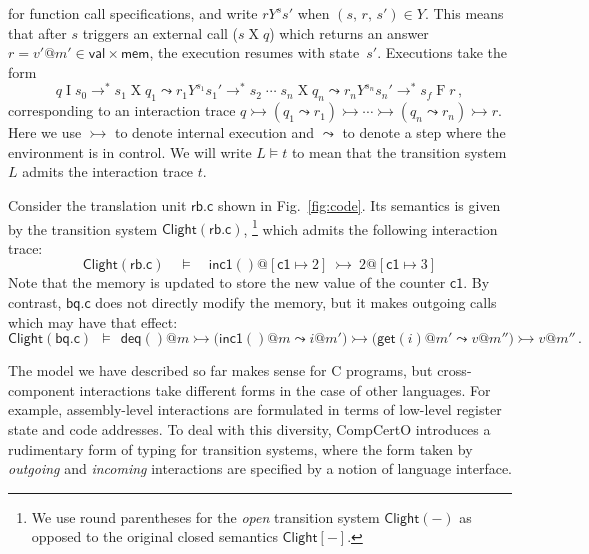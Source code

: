 \documentclass[acmsmall,screen,review,anonymous]{acmart}
\newcommand{\kw}[1]{\ensuremath{ \mathsf{#1} }}
\newcommand{\que}{\circ}
\newcommand{\ans}{\bullet}
\begin{document}
for function call specifications,
and write $r \mathrel{Y^s} s'$ when $(s, \, r, \, s') \in Y$.
This means that
after $s$ triggers an external call ($s \mathrel{X} q$)
which returns an answer $r = v'@m' \in \kw{val} \times \kw{mem}$,
the execution resumes with state~$s'$.
Executions take the form
\[
  q \mathrel{I} s_0 \rightarrow^*
  s_1 \mathrel{X} q_1 \leadsto
  r_1 \mathrel{Y^{s_1}} s_1' \rightarrow^*
  s_2 \mathrel{\cdots}
  s_n \mathrel{X} q_n \leadsto
  r_n \mathrel{Y^{s_n}} s_n' \rightarrow^*
  s_f \mathrel{F} r
  \,,
\]
corresponding to an interaction trace
$
  q \rightarrowtail
  (q_1 \leadsto r_1) \rightarrowtail
  \cdots \rightarrowtail
  (q_n \leadsto r_n) \rightarrowtail
  r
$.
Here we use $\rightarrowtail$ to denote internal execution
and $\leadsto$ to denote a step where the environment is in control.
We will write $L \vDash t$
to mean that the transition system $L$
admits the interaction trace $t$.


\begin{example} \label{ex:overview:clightsem} %
Consider the translation unit $\kw{rb.c}$ shown in Fig.~\ref{fig:code}.
Its semantics is given by 
the transition system $\kw{Clight}(\kw{rb.c})$,\!%
\footnote{%
  We use round parentheses for
  the \emph{open} transition system $\kw{Clight}(-)$
  as opposed to the original closed semantics $\kw{Clight}[-]$.
  }
which admits the following interaction trace:
\[
  \kw{Clight}(\kw{rb.c}) \quad \vDash \quad
  \kw{inc1}()@[\kw{c1} \mapsto 2]
  \: \rightarrowtail \:
  2@[\kw{c1} \mapsto 3]
\]
Note that the memory is updated to store the new value of the counter $\kw{c1}$.
By contrast, $\kw{bq.c}$
does not directly modify the memory,
but it makes outgoing calls which may have that effect:
\[
  \kw{Clight}(\kw{bq.c}) \:\: \vDash \:\:
  \kw{deq}()@m
  \rightarrowtail
  \big( \kw{inc1}()@m \leadsto i@m' \big)
  \rightarrowtail
  \big( \kw{get}(i)@m' \leadsto v@m'' \big)
  \rightarrowtail
  v@m''
  \,.
\]
\end{example}

The model we have described so far
makes sense for C programs,
but cross-component interactions take different forms
in the case of other languages.
For example,
assembly-level interactions are formulated in terms of
low-level register state and code addresses.
To deal with this diversity,
CompCertO introduces a rudimentary form of typing for transition systems,
where the form taken by \emph{outgoing} and \emph{incoming} interactions
are specified by a notion of language interface.
\end{document}
